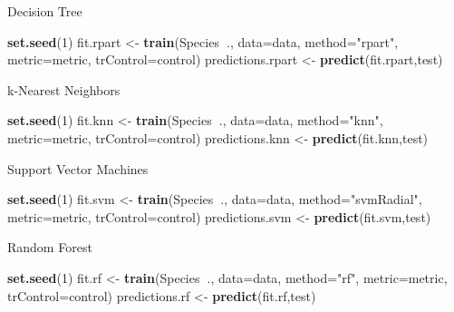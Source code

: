 \documentclass[]{article}
\newenvironment{Shaded}{\begin{snugshade}}{\end{snugshade}}
\newcommand{\KeywordTok}[1]{\textcolor[rgb]{0.13,0.29,0.53}{\textbf{#1}}}
\newcommand{\DataTypeTok}[1]{\textcolor[rgb]{0.13,0.29,0.53}{#1}}
\newcommand{\DecValTok}[1]{\textcolor[rgb]{0.00,0.00,0.81}{#1}}
\newcommand{\StringTok}[1]{\textcolor[rgb]{0.31,0.60,0.02}{#1}}
\newcommand{\OperatorTok}[1]{\textcolor[rgb]{0.81,0.36,0.00}{\textbf{#1}}}
\newcommand{\NormalTok}[1]{#1}
\begin{document}
Decision Tree

\begin{Shaded}
\begin{Highlighting}[]
\KeywordTok{set.seed}\NormalTok{(}\DecValTok{1}\NormalTok{)}
\NormalTok{fit.rpart <-}\StringTok{ }\KeywordTok{train}\NormalTok{(Species}\OperatorTok{~}\NormalTok{., }\DataTypeTok{data=}\NormalTok{data, }\DataTypeTok{method=}\StringTok{"rpart"}\NormalTok{, }\DataTypeTok{metric=}\NormalTok{metric, }\DataTypeTok{trControl=}\NormalTok{control)}
\NormalTok{predictions.rpart <-}\StringTok{ }\KeywordTok{predict}\NormalTok{(fit.rpart,test)}
\end{Highlighting}
\end{Shaded}

k-Nearest Neighbors

\begin{Shaded}
\begin{Highlighting}[]
\KeywordTok{set.seed}\NormalTok{(}\DecValTok{1}\NormalTok{)}
\NormalTok{fit.knn <-}\StringTok{ }\KeywordTok{train}\NormalTok{(Species}\OperatorTok{~}\NormalTok{., }\DataTypeTok{data=}\NormalTok{data, }\DataTypeTok{method=}\StringTok{"knn"}\NormalTok{, }\DataTypeTok{metric=}\NormalTok{metric, }\DataTypeTok{trControl=}\NormalTok{control)}
\NormalTok{predictions.knn <-}\StringTok{ }\KeywordTok{predict}\NormalTok{(fit.knn,test)}
\end{Highlighting}
\end{Shaded}

Support Vector Machines

\begin{Shaded}
\begin{Highlighting}[]
\KeywordTok{set.seed}\NormalTok{(}\DecValTok{1}\NormalTok{)}
\NormalTok{fit.svm <-}\StringTok{ }\KeywordTok{train}\NormalTok{(Species}\OperatorTok{~}\NormalTok{., }\DataTypeTok{data=}\NormalTok{data, }\DataTypeTok{method=}\StringTok{"svmRadial"}\NormalTok{, }\DataTypeTok{metric=}\NormalTok{metric, }\DataTypeTok{trControl=}\NormalTok{control)}
\NormalTok{predictions.svm <-}\StringTok{ }\KeywordTok{predict}\NormalTok{(fit.svm,test)}
\end{Highlighting}
\end{Shaded}

Random Forest

\begin{Shaded}
\begin{Highlighting}[]
\KeywordTok{set.seed}\NormalTok{(}\DecValTok{1}\NormalTok{)}
\NormalTok{fit.rf <-}\StringTok{ }\KeywordTok{train}\NormalTok{(Species}\OperatorTok{~}\NormalTok{., }\DataTypeTok{data=}\NormalTok{data, }\DataTypeTok{method=}\StringTok{"rf"}\NormalTok{, }\DataTypeTok{metric=}\NormalTok{metric, }\DataTypeTok{trControl=}\NormalTok{control)}
\NormalTok{predictions.rf <-}\StringTok{ }\KeywordTok{predict}\NormalTok{(fit.rf,test)}
\end{Highlighting}
\end{Shaded}
\end{document}
